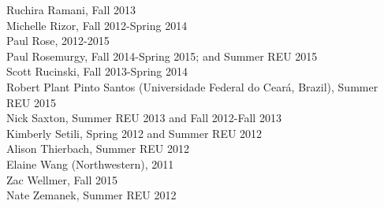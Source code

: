 \documentclass[9pt]{extarticle}
\begin{document}
Ruchira Ramani, Fall 2013 \\
Michelle Rizor, Fall 2012-Spring 2014 \\
Paul Rose, 2012-2015 \\
Paul Rosemurgy, Fall 2014-Spring 2015; and Summer REU 2015 \\
Scott Rucinski, Fall 2013-Spring 2014 \\
Robert Plant Pinto Santos (Universidade Federal do Cear\'{a}, Brazil), Summer REU 2015 \\
Nick Saxton, Summer REU 2013 and Fall 2012-Fall 2013 \\
Kimberly Setili, Spring 2012 and Summer REU 2012 \\
Alison Thierbach, Summer REU 2012 \\
Elaine Wang (Northwestern), 2011 \\
Zac Wellmer, Fall 2015 \\
Nate Zemanek, Summer REU 2012 \\
\end{document}
